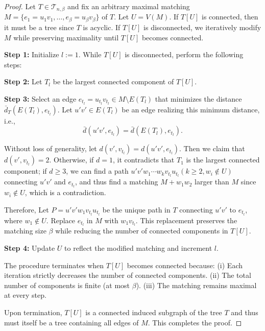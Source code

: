 \documentclass[12pt]{amsart}
\begin{document}
\begin{proof}
Let \( T \in \mathcal{T}_{n,\beta} \) and fix an arbitrary maximal matching 
 \( M = \{e_1 = u_1v_1, \dots, e_\beta = u_\beta v_\beta\} \) 
of \( T \). Let \( U = V(M) \).
If \( T[U] \) is connected, then it must be a tree since \( T \) is acyclic. If \( T[U] \) is disconnected, we iteratively modify \( M \) while preserving maximality until \( T[U] \) becomes connected.

\noindent \textbf{Step 1:} Initialize \( l := 1 \).  
While \( T[U] \) is disconnected, perform the following steps:

\noindent \textbf{Step 2:} Let \( T_l \) be the largest connected component of \( T[U] \).

\noindent \textbf{Step 3:} Select an edge \( e_{t_l} = u_{t_l}v_{t_l} \in M \setminus E(T_l) \) that minimizes the distance \( \bar{d}_T(E(T_l), e_{t_l}) \).  
Let \( u'v' \in E(T_l) \) be an edge realizing this minimum distance, i.e.,  
\[ \bar{d}(u'v', e_{t_l}) = \bar{d}(E(T_l), e_{t_l}). \]  

Without loss of generality, let $d(v',v_{t_l})=d(u'v',e_{t_l})$. Then we claim that $d(v',v_{t_l}) = 2$. Otherwise, if \( d = 1 \), it contradicts that \( T_1 \) is the largest connected component; if \( d \geq 3 \), we can find a path \( u'v'w_1 \cdots  w_kv_{t_l}u_{t_l} (k \geq 2, w_i \notin U)\) connecting \( u'v' \) and \( e_{t_l} \), and thus find a matching \( M + w_1w_2 \) larger than \( M \) since \( w_i \notin U \), which is a contradiction.

Therefore, Let \( P = u'v'w_1v_{t_l}u_{t_l}\) be the unique path in \( T \) connecting \( u'v' \) to \( e_{t_l} \), where \( w_1 \notin U \).  
Replace \( e_{t_l} \) in \( M \) with \( w_1v_{t_l} \). This replacement preserves the matching size \( \beta \) while reducing the number of connected components in \( T[U] \).

\noindent \textbf{Step 4:} Update \( U \) to reflect the modified matching and increment \( l \).

The procedure terminates when \( T[U] \) becomes connected because:  
(i) Each iteration strictly decreases the number of connected components.  
(ii) The total number of components is finite (at most \( \beta \)).  
(iii) The matching remains maximal at every step.  

Upon termination, \( T[U] \) is a connected induced subgraph of the tree \( T \) and thus must itself be a tree containing all edges of $M$. This completes the proof.  
\end{proof}
\end{document}
